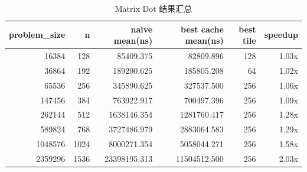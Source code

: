 \begin{table}[H]
\centering
\caption{Matrix Dot 结果汇总}
\label{tab:matrix_dot_results}
\small
\begin{tabular}{r r r r r r}
\toprule
problem\_size & n & naive mean(ns) & best cache mean(ns) & best tile & speedup \\
\midrule
16384 & 128 & 85409.375 & 82809.896 & 128 & 1.03x \\
36864 & 192 & 189290.625 & 185805.208 & 64 & 1.02x \\
65536 & 256 & 345890.625 & 327537.500 & 256 & 1.06x \\
147456 & 384 & 763922.917 & 700497.396 & 256 & 1.09x \\
262144 & 512 & 1638146.354 & 1281760.417 & 256 & 1.28x \\
589824 & 768 & 3727486.979 & 2883064.583 & 256 & 1.29x \\
1048576 & 1024 & 8000271.354 & 5058044.271 & 256 & 1.58x \\
2359296 & 1536 & 23398195.313 & 11504512.500 & 256 & 2.03x \\
\bottomrule
\end{tabular}
\end{table}